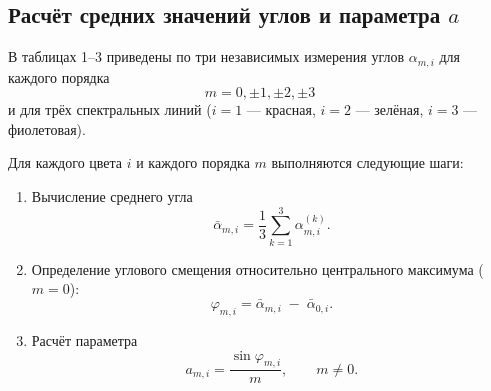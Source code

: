 \subsection{Расчёт средних значений углов и параметра \(a\)}

В таблицах 1–3 приведены по три независимых измерения углов \(\alpha_{m,i}\) для каждого порядка
\[
	m = 0, \pm1, \pm2, \pm3
\]
и для трёх спектральных линий (\(i=1\) — красная, \(i=2\) — зелёная, \(i=3\) — фиолетовая).

Для каждого цвета \(i\) и каждого порядка \(m\) выполняются следующие шаги:
\begin{enumerate}
	\item Вычисление среднего угла
	      \[
		      \bar\alpha_{m,i}
		      = \frac{1}{3}\sum_{k=1}^{3}\alpha_{m,i}^{(k)}.
	      \]
	\item Определение углового смещения относительно центрального максимума (\(m=0\)):
	      \[
		      \varphi_{m,i}
		      = \bar\alpha_{m,i} \;-\; \bar\alpha_{0,i}.
	      \]
	\item Расчёт параметра
	      \[
		      a_{m,i}
		      = \frac{\sin\varphi_{m,i}}{m},
		      \qquad m\neq 0.
	      \]
\end{enumerate}
